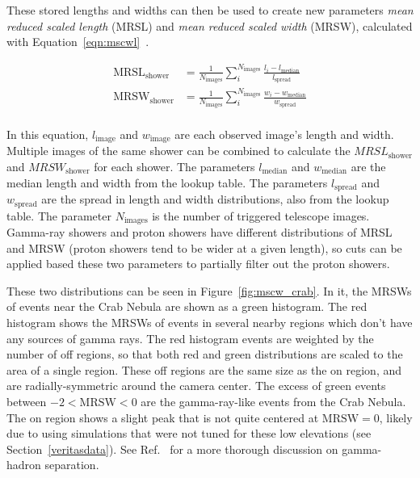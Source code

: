 These stored lengths and widths can then be used to create new parameters \textit{mean reduced scaled length} (MRSL) and \textit{mean reduced scaled width} (MRSW), calculated with Equation~\ref{eqn:mscwl}~\cite{mrswl_technique}.

\begin{equation}\label{eqn:mscwl}
  \begin{split}
    \textrm{MRSL}_{\textrm{shower}} & = \frac{1}{N_{\textrm{images}}} \sum_{i}^{N_{\textrm{images}}} \frac{l_{i}-l_{\textrm{median}}}{l_{\textrm{spread}}} \\
    \textrm{MRSW}_{\textrm{shower}} & = \frac{1}{N_{\textrm{images}}} \sum_{i}^{N_{\textrm{images}}} \frac{w_{i}-w_{\textrm{median}}}{w_{\textrm{spread}}} \\
  \end{split}
\end{equation}

In this equation, $l_{\textrm{image}}$ and $w_{\textrm{image}}$ are each observed image's length and width.
Multiple images of the same shower can be combined to calculate the $MRSL_{\textrm{shower}}$ and $MRSW_{\textrm{shower}}$ for each shower.
The parameters $l_{\textrm{median}}$ and $w_{\textrm{median}}$ are the median length and width from the lookup table.
The parameters $l_{\textrm{spread}}$ and $w_{\textrm{spread}}$ are the spread in length and width distributions, also from the lookup table.
The parameter $N_{\textrm{images}}$ is the number of triggered telescope images.
Gamma-ray showers and proton showers have different distributions of MRSL and MRSW (proton showers tend to be wider at a given length), so cuts can be applied based these two parameters to partially filter out the proton showers.

These two distributions can be seen in Figure~\ref{fig:mscw_crab}.
In it, the MRSWs of events near the Crab Nebula are shown as a green histogram.
The red histogram shows the MRSWs of events in several nearby regions which don't have any sources of gamma rays.
The red histogram events are weighted by the number of off regions, so that both red and green distributions are scaled to the area of a single region.
These off regions are the same size as the on region, and are radially-symmetric around the camera center.
The excess of green events between $-2<\mathrm{MRSW}<0$ are the gamma-ray-like events from the Crab Nebula.
The on region shows a slight peak that is not quite centered at $\mathrm{MRSW}=0$, likely due to using simulations that were not tuned for these low elevations (see Section~\ref{veritasdata}).
See Ref.~\cite{Krause2017} for a more thorough discussion on gamma-hadron separation.

